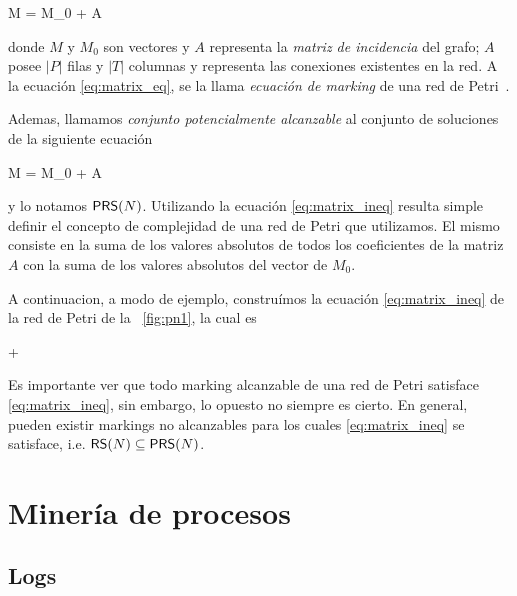 M = M_0 + A \cdot \widehat\sigma 
\eeq

donde $M$ y $M_0$ son vectores y $A$ representa la \emph{matriz de incidencia}
del grafo; $A$ posee $|P|$ filas y $|T|$ columnas y representa las conexiones 
existentes en la red.
A la ecuación \eqref{eq:matrix_eq}, se la llama \emph{ecuación de marking} de una red
de Petri~\cite{Murata89}.

Ademas, llamamos \emph{conjunto potencialmente alcanzable}
al conjunto de soluciones de la siguiente ecuación

M = M_0 + A \cdot \widehat\sigma {}
\eeq

y lo notamos $\textsf{PRS}(N)$.
Utilizando la ecuación \eqref{eq:matrix_ineq} resulta simple definir el concepto
de complejidad de una red de Petri que utilizamos. El mismo consiste en la suma
de los valores absolutos de todos los coeficientes de la matriz $A$ con la suma
de los valores absolutos del vector de $M_0$.

A continuacion, a modo de ejemplo, construímos la ecuación \eqref{eq:matrix_ineq} de
la red de Petri de la ~\autoref{fig:pn1}, la cual es

\beq
 \left[\begin{array}{c} 1 \\ 6 \end{array} \right] +
\left[\begin{array}{rr} 1 & -1 \\ -2 & 3 \end{array} \right]
\cdot
{}
\geq \left[\begin{array}{c} 0 \\ 0 \end{array} \right]
\eeq

Es importante ver que todo marking alcanzable de una red de Petri
satisface \eqref{eq:matrix_ineq}, sin embargo, lo opuesto no siempre es cierto.
En general, pueden existir markings no alcanzables para
los cuales \eqref{eq:matrix_ineq} se satisface, i.e. $\textsf{RS}(N) \subseteq \textsf{PRS}(N)$.

\section{Minería de procesos} 
\label{sec:2.process mining}

\subsection{Logs} 
\label{sec:2.logs}

